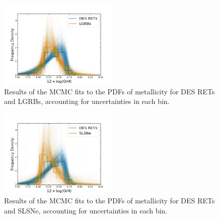 \documentclass[fleqn,usenatbib,]{mnras}
\begin{document}
\begin{figure}
\includegraphics[width=0.5\textwidth]{mc_figs/rets_k15_OH_histfit_final.png}
\caption{Results of the MCMC fits to the PDFs of metallicity for DES RETs and LGRBs, accounting for uncertainties in each bin.
\label{fig:histfit_oh_k15}}
\end{figure}

\begin{figure}
\includegraphics[width=0.5\textwidth]{mc_figs/rets_p16_OH_histfit_final.png}
\caption{Results of the MCMC fits to the PDFs of metallicity for DES RETs and SLSNe, accounting for uncertainties in each bin.
\label{fig:histfit_oh_p16}}
\end{figure}
\onecolumn


\bsp	%
\label{lastpage}
\end{document}
